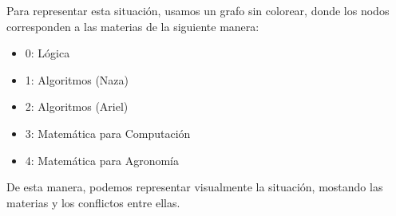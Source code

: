 \documentclass[a4paper,11pt]{article}
\begin{document}
Para representar esta situación, usamos un grafo sin colorear, donde los nodos corresponden a las materias de la siguiente manera:

\begin{itemize}
    \item 0: Lógica
    \item 1: Algoritmos (Naza)
    \item 2: Algoritmos (Ariel)
    \item 3: Matemática para Computación
    \item 4: Matemática para Agronomía
\end{itemize}

\begin{center}
\end{center}
De esta manera, podemos representar visualmente la situación, mostando las materias y los conflictos entre ellas.
\end{document}
